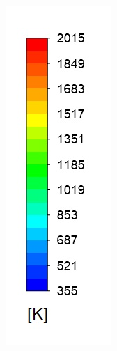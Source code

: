 \documentclass{webofc}
\begin{document}
\begin{figure}[h!]
\includegraphics[scale = 0.3]{temp}

\end{figure}
\end{document}
